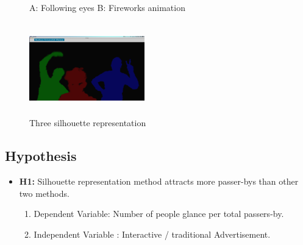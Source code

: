 \begin{figure}[!htb]
    \centering
    \hfill
    \caption{A: Following eyes  B: Fireworks animation }%
    \label{fig:Attraction_Attention}%
\end{figure}


\begin{figure}[H]
    \centering
    \includegraphics[width=50mm,height=40mm]{Figures/3/silhouttee}
    \caption{Three silhouette representation}%
    \label{fig:silhouttee}%
\end{figure}



\subsection{Hypothesis}

\begin{itemize}
\item \textbf{H1:} Silhouette representation method attracts more passer-bys than other two methods.
    \begin{enumerate}
        \item Dependent Variable: Number of people glance per total passers-by.
        \item Independent Variable : Interactive / traditional Advertisement.
    \end{enumerate}       
\end{itemize}



